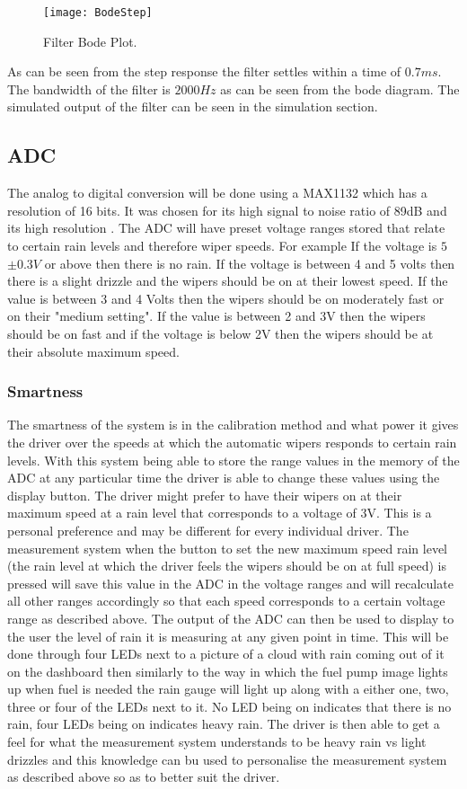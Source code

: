 \documentclass[conference, 11pt]{IEEEtran}
\begin{document}
 \begin{figure}[H]
 \centering 
 \texttt{[image: BodeStep]}
 \centering 
  \caption {Filter Bode Plot. }
 \end{figure}

As can be seen from the step response the filter settles within a time of $0.7ms$. The bandwidth of the filter is $2000Hz$ as can be seen from the bode diagram. The simulated output of the filter can be seen in the simulation section. 


\subsection{ADC}
The analog to digital conversion will be done using a MAX1132 which has a resolution of 16 bits. It was chosen for its high signal to noise ratio of 89dB and its high resolution \cite{ADC}. The ADC will have preset voltage ranges stored that relate to certain rain levels and therefore wiper speeds. For example If the voltage is $5$ $\pm 0.3V$ or above then there is no rain. If the voltage is between 4 and 5 volts then there is a slight drizzle and the wipers should be on at their lowest speed. If the value is between 3 and 4 Volts then the wipers should be on moderately fast or on their "medium setting". If the value is between 2 and 3V then the wipers should be on fast and if the voltage is below 2V then the wipers should be at their absolute maximum speed.

\subsubsection{Smartness}
The smartness of the system is in the calibration method and what power it gives the driver over the speeds at which the automatic wipers responds to certain rain levels. With this system being able to store the range values in the memory of the ADC at any particular time the driver is able to change these values using the display button. The driver might prefer to have their wipers on at their maximum speed at a rain level that corresponds to a voltage of 3V. This is a personal preference and may be different for every individual driver. The measurement system when the button to set the new maximum speed rain level (the rain level at which the driver feels the wipers should be on at full speed) is pressed will save this value in the ADC in the voltage ranges and will recalculate all other ranges accordingly so that each speed corresponds to a certain voltage range as described above. The output of the ADC can then be used to display to the user the level of rain it is measuring at any given point in time. This will be done through four LEDs next to a picture of a cloud with rain coming out of it on the dashboard then similarly to the way in which the fuel pump image lights up when fuel is needed the rain gauge will light up along with a either one, two, three or four of the LEDs next to it. No LED being on indicates that there is no rain, four LEDs being on indicates heavy rain. The driver is then able to get a feel for what the measurement system understands to be heavy rain vs light drizzles and this knowledge can bu used to personalise the measurement system as described above so as to better suit the driver. 
\end{document}
